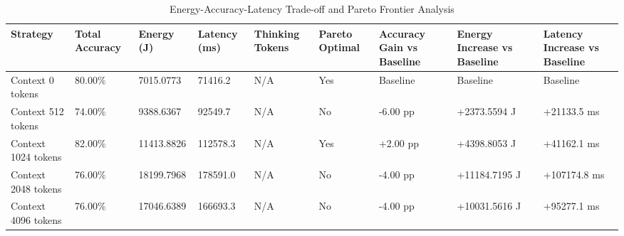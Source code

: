 \begin{table}
\caption{Energy-Accuracy-Latency Trade-off and Pareto Frontier Analysis}
\label{tab:tradeoff_comparison}
\begin{tabular}{lllllllll}
\toprule
Strategy & Total Accuracy & Energy (J) & Latency (ms) & Thinking Tokens & Pareto Optimal & Accuracy Gain vs Baseline & Energy Increase vs Baseline & Latency Increase vs Baseline \\
\midrule
Context 0 tokens & 80.00\% & 7015.0773 & 71416.2 & N/A & Yes & Baseline & Baseline & Baseline \\
Context 512 tokens & 74.00\% & 9388.6367 & 92549.7 & N/A & No & -6.00 pp & +2373.5594 J & +21133.5 ms \\
Context 1024 tokens & 82.00\% & 11413.8826 & 112578.3 & N/A & Yes & +2.00 pp & +4398.8053 J & +41162.1 ms \\
Context 2048 tokens & 76.00\% & 18199.7968 & 178591.0 & N/A & No & -4.00 pp & +11184.7195 J & +107174.8 ms \\
Context 4096 tokens & 76.00\% & 17046.6389 & 166693.3 & N/A & No & -4.00 pp & +10031.5616 J & +95277.1 ms \\
\bottomrule
\end{tabular}
\end{table}

